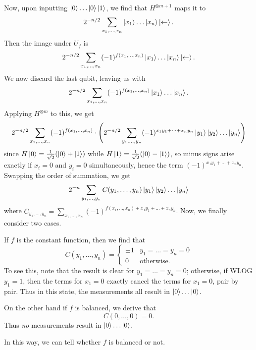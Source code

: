 \begin{problem}
\begin{sol}
		Now, upon inputting $\ket0 \dots \ket0 \ket1$, we find that $H^{\otimes m+1}$ maps it to
		\[ 2^{-n/2} \sum_{x_1, \dots, x_n} \ket{x_1} \dots \ket{x_n} \ket\leftarrow.  \]
		Then the image under $U_f$ is
		\[ 2^{-n/2} \sum_{x_1, \dots, x_n} (-1)^{f(x_1, \dots, x_n)} \ket{x_1} \dots \ket{x_n} \ket\leftarrow.  \]
		We now discard the last qubit, leaving us with
		\[ 2^{-n/2} \sum_{x_1, \dots, x_n} (-1)^{f(x_1, \dots, x_n)} \ket{x_1} \dots \ket{x_n}.  \]
		Applying $H^{\otimes m}$ to this, we get
		\[ 2^{-n/2} \sum_{x_1, \dots, x_n} (-1)^{f(x_1, \dots, x_n)}
			\cdot
			\left(
			2^{-n/2}
			\sum_{y_1, \dots, y_n}
			(-1)^{x_1 y_1 + \dots + x_n y_n}
			\ket{y_1} \ket{y_2} \dots \ket{y_n}
			\right)
		\]
		since $H\ket0 = \frac{1}{\sqrt2}(\ket0+\ket1)$
		while $H\ket1 = \frac{1}{\sqrt2}(\ket0-\ket1)$,
		so minus signs arise exactly if $x_i = 0$ and $y_i = 0$ simultaneously,
		hence the term $(-1)^{x_1 y_1 + \dots + x_n y_n}$.
		Swapping the order of summation, we get
		\[ 
			2^{-n}
			\sum_{y_1, \dots, y_n}
			C(y_1, \dots, y_n)
			\ket{y_1} \ket{y_2} \dots \ket{y_n}
		\]
		where $C_{y_1, \dots, y_n} 
		= \sum_{x_1, \dots, x_n} (-1)^{f(x_1, \dots, x_n)
			+x_1 y_1 + \dots + x_n y_n}$.
		Now, we finally consider two cases.
		\begin{itemize}
			\ii If $f$ is the constant function, then we find that
			\[
				C(y_1, \dots, y_n) = 
				\begin{cases}
					\pm 1 &  y_1 = \dots = y_n = 0 \\
					0 & \text{otherwise}.
				\end{cases}
			\]
			To see this, note that the result is clear for $y_1 = \dots = y_n = 0$;
			otherwise, if WLOG $y_1 = 1$, then the terms for $x_1 = 0$ exactly cancel
			the terms for $x_1 = 0$, pair by pair.
			Thus in this state, the measurements all result in $\ket0 \dots \ket0$.

			\ii On the other hand if $f$ is balanced, we derive that
			\[ C(0, \dots, 0) = 0. \]
			Thus \emph{no} measurements result in $\ket 0 \dots \ket 0$.
		\end{itemize}
		In this way, we can tell whether $f$ is balanced or not.
	\end{sol}
\end{problem}


